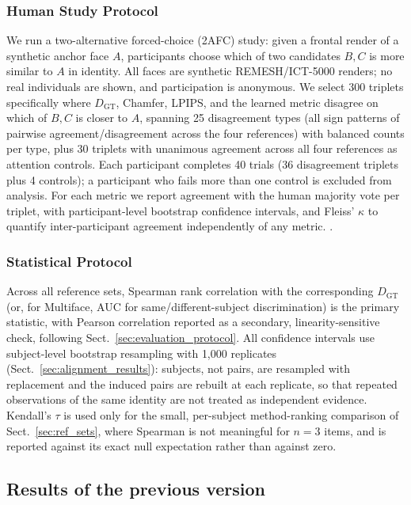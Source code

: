 \subsubsection{Human Study Protocol}
\label{sec:human_study}
We run a two-alternative forced-choice (2AFC) study: given a frontal render of a synthetic anchor face $A$, participants choose which of two candidates $B,C$ is more similar to $A$ in identity. All faces are synthetic REMESH/ICT-5000 renders; no real individuals are shown, and participation is anonymous. We select 300 triplets specifically where $D_{\mathrm{GT}}$, Chamfer, LPIPS, and the learned metric disagree on which of $B,C$ is closer to $A$, spanning 25 disagreement types (all sign patterns of pairwise agreement/disagreement across the four references) with balanced counts per type, plus 30 triplets with unanimous agreement across all four references as attention controls. Each participant completes 40 trials (36 disagreement triplets plus 4 controls); a participant who fails more than one control is excluded from analysis. For each metric we report agreement with the human majority vote per triplet, with participant-level bootstrap confidence intervals, and Fleiss' $\kappa$ to quantify inter-participant agreement independently of any metric. .

\subsubsection{Statistical Protocol}
\label{sec:statistics}
Across all reference sets, Spearman rank correlation with the corresponding $D_{\mathrm{GT}}$ (or, for Multiface, AUC for same/different-subject discrimination) is the primary statistic, with Pearson correlation reported as a secondary, linearity-sensitive check, following Sect.~\ref{sec:evaluation_protocol}. All confidence intervals use subject-level bootstrap resampling with 1,000 replicates (Sect.~\ref{sec:alignment_results}): subjects, not pairs, are resampled with replacement and the induced pairs are rebuilt at each replicate, so that repeated observations of the same identity are not treated as independent evidence. Kendall's $\tau$ is used only for the small, per-subject method-ranking comparison of Sect.~\ref{sec:ref_sets}, where Spearman is not meaningful for $n=3$ items, and is reported against its exact null expectation rather than against zero.

\subsection{Results of the previous version}
